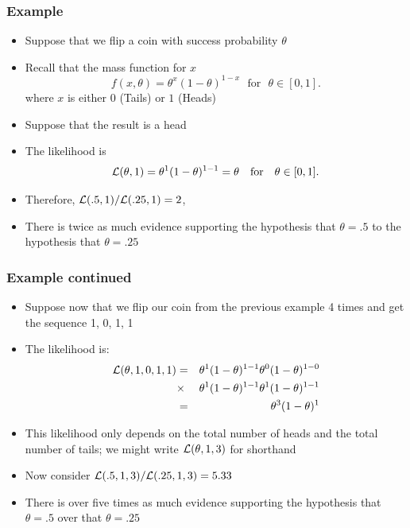 \documentclass[aspectratio=169]{beamer}
\begin{document}
\begin{frame}\frametitle{Example}
\begin{itemize}
\item Suppose that we flip a coin with success probability $\theta$
\item Recall that the mass function for $x$
  $$
  f(x,\theta) = \theta^x(1 - \theta)^{1 - x}  ~~~\mbox{for}~~~ \theta \in [0,1].
  $$
  where $x$ is either $0$ (Tails) or $1$ (Heads) 
\item Suppose that the result is a head
\item The likelihood is
  $$
  {\cal L}(\theta, 1) = \theta^1 (1 - \theta)^{1 - 1} = \theta  ~~~\mbox{for} ~~~ \theta \in [0,1].
  $$
\item Therefore, ${\cal L}(.5, 1) / {\cal L}(.25, 1) = 2$, 
\item There is twice as much evidence supporting the hypothesis that $\theta = .5$ to the
hypothesis that $\theta = .25$
\end{itemize}
\end{frame}

\begin{frame}\frametitle{Example continued}
\begin{itemize}
\item   Suppose now that we flip our coin from the previous example 4 times and
  get the sequence 1, 0, 1, 1
\item The likelihood is:
  \begin{eqnarray*}
  {\cal L}(\theta, 1,0,1,1) & = & \theta^1 (1 - \theta)^{1 - 1}
  \theta^0 (1 - \theta)^{1 - 0}  \\
& \times & \theta^1 (1 - \theta)^{1 - 1} 
   \theta^1 (1 - \theta)^{1 - 1}\\
& = &  \theta^3(1 - \theta)^1
  \end{eqnarray*}
\item This likelihood only depends on the total number of heads and
  the total number of tails; we might write ${\cal L}(\theta, 1, 3)$
  for shorthand
\item Now consider ${\cal L}(.5, 1, 3) / {\cal L}(.25, 1, 3) = 5.33$
\item There is over five times as much evidence supporting the
  hypothesis that $\theta = .5$ over that $\theta = .25$
\end{itemize}
\end{frame}
\end{document}
